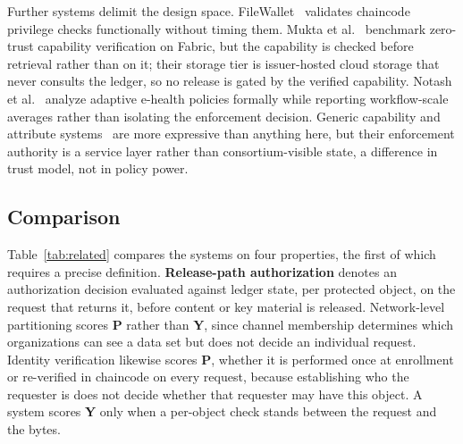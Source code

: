 \documentclass[preprint,12pt]{elsarticle}
\begin{document}
Further systems delimit the design space. FileWallet~\cite{chen2022filewallet} validates
chaincode privilege checks functionally without timing them. Mukta et
al.~\cite{mukta2026zerotrust} benchmark zero-trust capability verification on
Fabric, but the capability is checked before retrieval rather than on it;
their storage tier is issuer-hosted cloud storage that never consults the
ledger, so no release is gated by the verified capability. Notash et al.~\cite{notash2026adaptive} analyze adaptive
e-health policies formally while reporting workflow-scale averages rather than
isolating the enforcement decision. Generic capability and attribute
systems~\cite{macaroons2014,zanzibar2019,hu2014guide} are more expressive than
anything here, but their enforcement authority is a service layer rather than
consortium-visible state, a difference in trust model, not in policy
power.

\subsection{Comparison}
\label{sec:comparison}

Table~\ref{tab:related} compares the systems on four properties, the first
of which requires a precise definition. \textbf{Release-path authorization} denotes an authorization
decision evaluated against ledger state, per protected object, on the request
that returns it, before content or key material is released. Network-level
partitioning scores \textbf{P} rather than \textbf{Y}, since channel
membership determines which organizations can see a data set but does not
decide an individual request. Identity verification likewise scores \textbf{P},
whether it is performed once at enrollment or re-verified in chaincode on every
request, because establishing who the requester is does not decide whether that
requester may have this object. A system scores \textbf{Y} only when a
per-object check stands between the request and the bytes.
\end{document}

